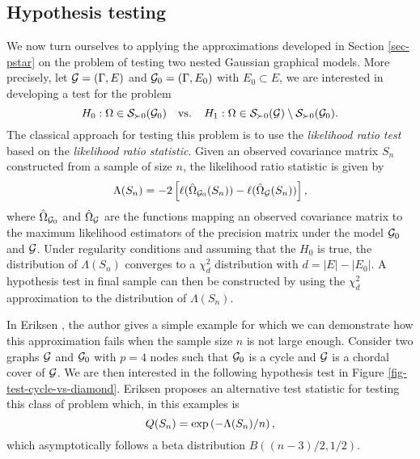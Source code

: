 \subsection{Hypothesis testing} \label{sec-hyp-test}


We now turn ourselves to applying the approximations developed in Section \ref{sec-pstar} on the problem of testing two nested Gaussian graphical models. More precisely, let ${\mathcal{G}} = (\Gamma, E)$ and ${\mathcal{G}}_0 = (\Gamma, E_0)$ with $E_0 \subset E$, we are interested in developing a test for the problem
\begin{equation} \label{eq-null-general-graph}
    H_0 : \Omega \in {\mathcal{S}}_{\succ 0}({\mathcal{G}}_0)\ \ {\textrm{ vs. }}\ \ H_1 : \Omega \in {\mathcal{S}}_{\succ 0}({\mathcal{G}}) \setminus {\mathcal{S}}_{\succ 0}({\mathcal{G}}_0).
\end{equation}
The classical approach for testing this problem is to use the \textit{likelihood ratio test} based on the \textit{likelihood ratio statistic}. Given an observed covariance matrix $S_n$ constructed from a sample of size $n$, the likelihood ratio statistic is given by
\begin{equation*}
    \Lambda(S_n) = -2 \left[\ell(\hat\Omega_{{\mathcal{G}}_0}(S_n)) - \ell(\hat\Omega_{\mathcal{G}}(S_n))\right],
\end{equation*}
where $\hat\Omega_{{\mathcal{G}}_0}$ and $\hat\Omega_{\mathcal{G}}$ are the functions mapping an observed covariance matrix to the maximum likelihood estimators of the precision matrix under the model ${\mathcal{G}}_0$ and ${\mathcal{G}}$. Under regularity conditions and assuming that the $H_0$ is true, the distribution of $\Lambda(S_n)$ converges to a $\chi^2_d$ distribution with $d = |E| - |E_0|$. A hypothesis test in final sample can then be constructed by using the $\chi^2_d$ approximation to the distribution of $\Lambda(S_n)$.

In Eriksen \cite{eriksen1996tests}, the author gives a simple example for which we can demonstrate how this approximation fails when the sample size $n$ is not large enough. Consider two graphs ${\mathcal{G}}$ and ${\mathcal{G}}_0$ with $p = 4$ nodes such that ${\mathcal{G}}_0$ is a cycle and ${\mathcal{G}}$ is a chordal cover of ${\mathcal{G}}$. We are then interested in the following hypothesis test in Figure \ref{fig-test-cycle-vs-diamond}. Eriksen proposes an alternative test statistic for testing this class of problem which, in this examples is
\begin{equation} \label{eq-q-stat}
    Q(S_n) = \exp\left(-\Lambda(S_n) / n\right),
\end{equation}
which asymptotically follows a beta distribution $B((n - 3)/2, 1/2)$.



